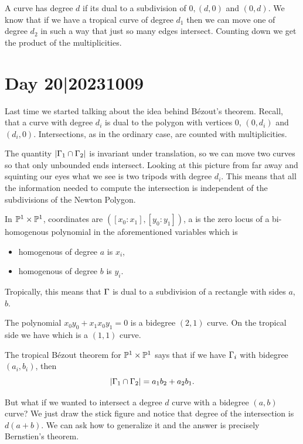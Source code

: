 \documentclass[12pt]{memoir}
\begin{document}
A curve has degree $d$ if its dual to a subdivision of $0,(d,0)$ and $(0,d)$. We know that if we have a tropical curve of degree $d_1$ then we can move one of degree $d_2$ in such a way that just so many edges intersect. Counting down we get the product of the multiplicities.

\section{Day 20|20231009}

Last time we started talking about the idea behind Bézout's theorem. Recall, that a curve with degree $d_i$ is dual to the polygon with vertices $0$, $(0,d_i)$ and $(d_i,0)$. Intersections, as in the ordinary case, are counted with multiplicities.\par 
The quantity $|\Gamma_1\cap \Gamma_2|$ is invariant under translation, so we can move two curves so that only unbounded ends intersect. Looking at this picture from far away and squinting our eyes what we see is two tripods with degree $d_i$. This means that all the information needed to compute the intersection is independent of the subdivisions of the Newton Polygon.
\begin{Def}
    In $\mathbb{P}^1\times\mathbb{P}^1$, coordinates are $([x_0:x_1],[y_0:y_1])$, a  is the zero locus of a bi-homogenous polynomial in the aforementioned variables which is 
    \begin{itemize}
        \item homogenous of degree $a$ is $x_i$,
        \item homogenous of degree $b$ is $y_i$.
    \end{itemize}    
    Tropically, this means that $\Gamma$ is dual to a subdivision of a rectangle with sides $a$, $b$.
\end{Def}

\begin{Ex}
    The polynomial $x_0y_0+x_1x_0y_1=0$ is a bidegree $(2,1)$ curve. On the tropical side we have  which is a $(1,1)$ curve.
\end{Ex}

The tropical Bézout theorem for $\mathbb{P}^1\times\mathbb{P}^1$ says that if we have $\Gamma_i$ with bidegree $(a_i,b_i)$, then 
$$|\Gamma_1\cap\Gamma_2|=a_1b_2+a_2b_1.$$

But what if we wanted to intersect a degree $d$ curve with a bidegree $(a,b)$ curve? We just draw the stick figure and notice that degree of the intersection is $d(a+b)$. We can ask how to generalize it and the answer is precisely Bernstien's theorem.
\end{document}
